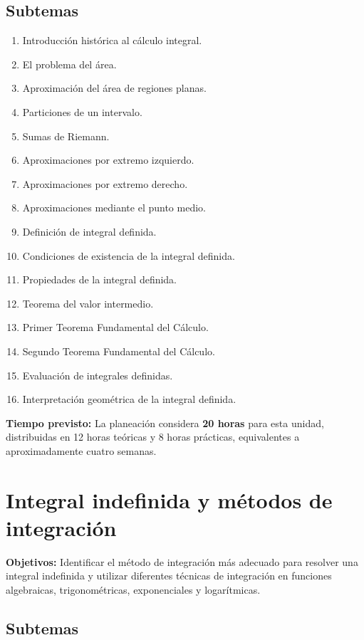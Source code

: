 \documentclass[12pt]{article}
\begin{document}
\subsection{Subtemas}

\begin{enumerate}
    \item Introducción histórica al cálculo integral.
    \item El problema del área.
    \item Aproximación del área de regiones planas.
    \item Particiones de un intervalo.
    \item Sumas de Riemann.
    \item Aproximaciones por extremo izquierdo.
    \item Aproximaciones por extremo derecho.
    \item Aproximaciones mediante el punto medio.
    \item Definición de integral definida.
    \item Condiciones de existencia de la integral definida.
    \item Propiedades de la integral definida.
    \item Teorema del valor intermedio.
    \item Primer Teorema Fundamental del Cálculo.
    \item Segundo Teorema Fundamental del Cálculo.
    \item Evaluación de integrales definidas.
    \item Interpretación geométrica de la integral definida.
\end{enumerate}

\textbf{Tiempo previsto:} La planeación considera \textbf{20 horas} para esta unidad, distribuidas en 12 horas teóricas y 8 horas prácticas, equivalentes a aproximadamente cuatro semanas.

\section{Integral indefinida y métodos de integración}

\textbf{Objetivos:} Identificar el método de integración más adecuado para resolver una integral indefinida y utilizar diferentes técnicas de integración en funciones algebraicas, trigonométricas, exponenciales y logarítmicas.

\subsection{Subtemas}
\end{document}
